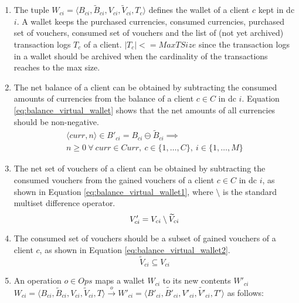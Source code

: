 \begin{enumerate}
	\item The tuple $W_{ci} = \langle B_{ci}, \widetilde{B}_{ci}, V_{ci}, \widetilde{V}_{ci}, T_{c} \rangle$ defines the wallet of a client $c$ kept in \gls{dc} $i$. A wallet keeps the purchased currencies, consumed currencies, purchased set of vouchers, consumed set of vouchers and the list of (not yet archived) transaction logs $T_{c}$ of a client. $|T_{c}| <= MaxTSize$ since the transaction logs in a wallet should be archived when the cardinality of the transactions reaches to the max size.

	\item The net balance of a client can be obtained by subtracting the consumed amounts of currencies from the balance of a client $c \in C$ in \gls{dc} $i$. Equation \ref{eq:balance_virtual_wallet} shows that the net amounts of all currencies should be non-negative.
	\begin{multline}  \label{eq:balance_virtual_wallet}
		\langle curr, n \rangle \in B'_{ci} = B_{ci} \ominus \widetilde{B}_{ci} \implies \\
		n \ge 0 ~ \forall ~  curr \in Curr, ~  c \in \{1,\dots, C\},  ~  i \in \{1,\dots, M\} 
	\end{multline}

	\item The net set of vouchers of a client can be obtained by subtracting the consumed vouchers from the gained vouchers of a client $c \in C$ in \gls{dc} $i$, as shown in Equation \ref{eq:balance_virtual_wallet1}, where $\setminus$ is the standard multiset difference operator.
	\begin{equation} \label{eq:balance_virtual_wallet1}
		V'_{ci} = V_{ci} \setminus \widetilde{V}_{ci} \\
	\end{equation}
  
	\item The consumed set of vouchers should be a subset of gained vouchers of a client $c$, as shown in Equation \ref{eq:balance_virtual_wallet2}.
	\begin{equation}  \label{eq:balance_virtual_wallet2}
		\widetilde{V}_{ci} \subseteq V_{ci}   
	\end{equation}
		
	\item An operation $o \in Ops$ maps a wallet $W_{ci}$ to its new contents $W'_{ci}$  $W_{ci} = \langle B_{ci}, \widetilde{B}_{ci}, V_{ci}, \widetilde{V}_{ci}, T \rangle \overset{o}{\rightarrow} W'_{ci} = \langle B'_{ci}, \widetilde{B'}_{ci}, V'_{ci}, \widetilde{V'}_{ci}, T' \rangle$ as follows: 
	

\end{enumerate}
